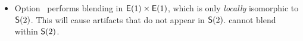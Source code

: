 \begin{itemize}
\item
  Option~ performs blending in $\mathsf{E}(1) \times \mathsf{E}(1)$,
  which is only \emph{locally} isomorphic to $\mathsf{S}(2)$.  This will cause artifacts
  that do not appear in $\mathsf{S}(2)$.  \App{} cannot blend within $\mathsf{S}(2)$.
\fi%
\end{itemize}



